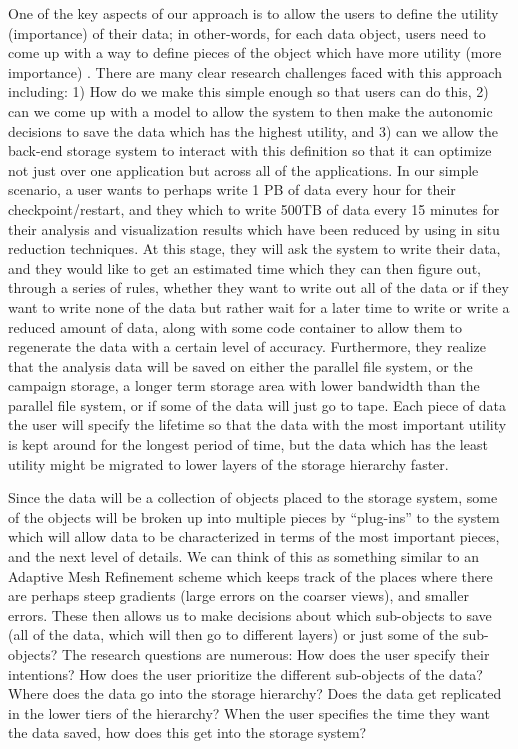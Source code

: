 One of the key aspects of our approach is to allow the users to define the
utility (importance) of their data; in other-words, for each data object, users
need to come up with a way to define pieces of the object which have more
utility (more importance) . There are many clear research challenges faced with
this approach including: 1) How do we make this simple enough so that users can
do this, 2) can we come up with a model to allow the system to then make the
autonomic decisions to save the data which has the highest utility, and 3) can
we allow the back-end storage system to interact with this definition so that
it can optimize not just over one application but across all of the
applications.
  In our simple scenario, a user wants to perhaps write 1 PB of data every hour
for their checkpoint/restart, and they which to write 500TB of data every 15
minutes for their analysis and visualization results which have been reduced by
using in situ reduction techniques. At this stage, they will ask the system to
write their data, and they would like to get an estimated time which they can
then figure out, through a series of rules, whether they want to write out all
of the data or if they want to write none of the data but rather wait for a
later time to write or write a reduced amount of data, along with some code
container to allow them to regenerate the data with a certain level of
accuracy.  Furthermore, they realize that the analysis data will be saved on
either the parallel file system, or the campaign storage, a longer term storage
area with lower bandwidth than the parallel file system, or if some of the data
will just go to tape. Each piece of data the user will specify the lifetime so
that the data with the most important utility is kept around for the longest
period of time, but the data which has the least utility might be migrated to
lower layers of the storage hierarchy faster. 

Since the data will be a collection of objects placed to the storage system,
some of the objects will be broken up into multiple pieces by ``plug-ins''
to the system which will allow data to be characterized in terms of the most
important pieces, and the next level of details. We can think of this as
something similar to an Adaptive Mesh Refinement scheme which keeps track of
the places where there are perhaps steep gradients (large errors on the
coarser views), and smaller errors. These then allows us to make decisions
about which sub-objects to save (all of the data, which will then go to
different layers) or just some of the sub-objects? The research questions
are numerous: How does the user specify their intentions? How does the user
prioritize the different sub-objects of the data? Where does the data go
into the storage hierarchy? Does the data get replicated in the lower tiers
of the hierarchy? When the user specifies the time they want the data saved,
how does this get into the storage system?

